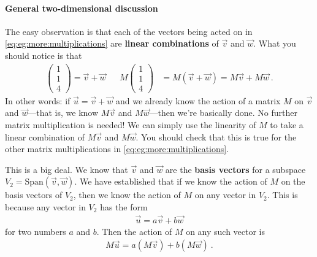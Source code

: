 \documentclass[12pt]{article}
\begin{document}
\paragraph{General two-dimensional discussion}
The easy observation is that each of the vectors being acted on in \eqref{eq:eg:more:multiplications} are \textbf{linear combinations} of $\vec{v}$ and $\vec{w}$. What you should notice is that
\begin{align}
    \begin{pmatrix}
        1 \\ 1 \\ 4
    \end{pmatrix}
    = \vec{v} + \vec{w}
    &
    & 
    M
    \begin{pmatrix}
        1 \\ 1 \\ 4
    \end{pmatrix}
    &=
    M(\vec{v} + \vec{w})
    = M\vec{v} + M\vec{w} \ .
\end{align}
In other words: if $\vec{u} = \vec{v} + \vec{w}$ and we already know the action of a matrix $M$ on $\vec{v}$ and $\vec{w}$---that is, we know $M\vec{v}$ and $M\vec{w}$---then we're basically done. No further matrix multiplication is needed! We can simply use the linearity of $M$ to take a linear combination of $M\vec{v}$ and $M\vec{w}$. You should check that this is true for the other matrix multiplications in \eqref{eq:eg:more:multiplications}.


This is a big deal. We know that $\vec{v}$ and $\vec{w}$ are the \textbf{basis vectors} for a subspace $V_2 = \text{Span}(\vec{v},\vec{w})$. We have established that if we know the action of $M$ on the basis vectors of $V_2$, then we know the action of $M$ on any vector in $V_2$. This is because any vector in $V_2$ has the form
\begin{align}
    \vec{u} = a\vec{v} + b \vec{w}
\end{align}
for two numbers $a$ and $b$. Then the action of $M$ on any such vector is
\begin{align}
    M\vec{u} = a(M\vec{v}) + b(M\vec{w}) \ .
    \label{eq:Mu:aMv:bMw}
\end{align}
\end{document}
